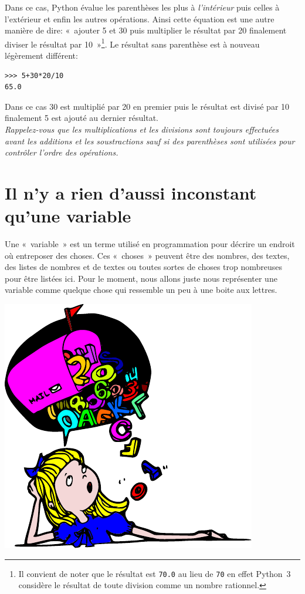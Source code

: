 Dans ce cas, Python évalue les parenthèses les plus à \emph{l'intérieur} puis celles à l'extérieur et enfin les autres opérations. Ainsi cette équation est une autre manière de dire: «~ajouter 5 et 30 puis multiplier le résultat par 20 finalement diviser le résultat par 10~»\footnote{Il convient de noter que le résultat est \texttt{70.0} au lieu de \texttt{70} en effet Python~3 considère le résultat de toute division comme un nombre rationnel.}. Le résultat sans parenthèse est à nouveau légèrement différent: 

\begin{Verbatim}[frame=single,rulecolor=\color{mbleu}, label=à taper]
>>> 5+30*20/10
65.0
\end{Verbatim}

Dans ce cas 30 est multiplié par 20 en premier puis le résultat est divisé par 10 finalement 5 est ajouté au dernier résultat.\\


\emph{Rappelez-vous que les multiplications et les divisions sont toujours effectuées avant les additions et les soustractions sauf si des parenthèses sont utilisées pour contrôler l'ordre des opérations.}


\section{Il n'y a rien d'aussi inconstant qu'une variable}

Une «~variable~» est un terme utilisé en programmation pour décrire un endroit où entreposer des choses. Ces «~choses~» peuvent être des nombres, des textes, des listes de nombres et de textes ou toutes sortes de choses trop nombreuses pour être listées ici. Pour le moment, nous allons juste nous représenter une variable comme quelque chose qui ressemble un peu à une boite aux lettres.

\begin{center}
\includegraphics[scale=1]{images/boite.pdf} 
\end{center}

